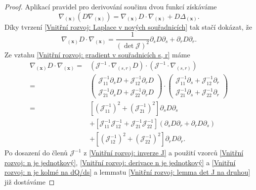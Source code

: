 \begin{proof}
    Aplikací pravidel pro derivování součinu dvou funkcí získáváme
    \begin{equation}
        \nabla_{(\mathbf{x})}\left(D\nabla_{(\mathbf{x})}\right) = \nabla_{(\mathbf{x})}D \cdot \nabla_{(\mathbf{x})} + D \Delta_{(\mathbf{x})}.
    \end{equation}
    Díky tvrzení \ref{Vnitřní rozvoj: Laplace v nových souřadnicích} tak stačí dokázat, že
    \begin{equation}
        \nabla_{(\mathbf{x})}D \cdot \nabla_{(\mathbf{x})} = \frac{1}{(\det \mathcal{J})^2}\partial_s D\partial_s + \partial_r D \partial_r.
    \end{equation}
    Ze vztahu \eqref{Vnitřní rozvoj: gradient v souřadnicích s, r} máme
    \begin{equation}
    \begin{aligned}
        \nabla_{(\mathbf{x})}D \cdot \nabla_{(\mathbf{x})} =&\left(\mathcal{J}^{-1} \cdot \nabla_{(s, r)}D \right) \cdot \left( \mathcal{J}^{-1} \cdot \nabla_{(s, r)}\right)\\
        =& \begin{pmatrix}
            \mathcal{J}^{-1}_{11}\partial_s D+ \mathcal{J}^{-1}_{12}\partial_r D \\
            \mathcal{J}^{-1}_{21}\partial_s D+ \mathcal{J}^{-1}_{22}\partial_r D
        \end{pmatrix} \cdot
        \begin{pmatrix}
            \mathcal{J}^{-1}_{11}\partial_s + \mathcal{J}^{-1}_{12}\partial_r\\
            \mathcal{J}^{-1}_{21}\partial_s + \mathcal{J}^{-1}_{22}\partial_r
        \end{pmatrix}\\
        =& \left[\left(\mathcal{J}^{-1}_{11}\right)^2 + \left(\mathcal{J}^{-1}_{21}\right)^2 \right] \partial_s D \partial_s\\
        &+ \left[\mathcal{J}^{-1}_{11}\mathcal{J}^{-1}_{12} + \mathcal{J}^{-1}_{21}\mathcal{J}^{-1}_{22} \right] \left(\partial_s D \partial_r + \partial_r D \partial_s \right)\\
        &+ \left[\left(\mathcal{J}^{-1}_{12}\right)^2 + \left(\mathcal{J}^{-1}_{22}\right)^2 \right] \partial_r D \partial_r.
    \end{aligned}
    \end{equation}
    Po dosazení do členů \(\mathcal{J}^{-1}\) z \eqref{Vnitřní rozvoj: inverze J} a použití vzorců \eqref{Vnitřní rozvoj: n je jednotkový}, \eqref{Vnitřní rozvoj: derivace n je jednotkový} a \eqref{Vnitřní rozvoj: n je kolmé na dQ/ds} a lemmatu \ref{Vnitřní rozvoj: lemma det J na druhou} již dostáváme

\end{proof}
